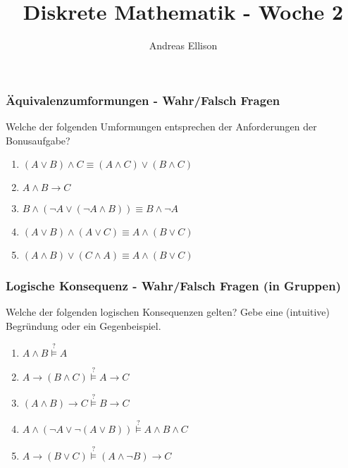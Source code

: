 \documentclass[t,dvipsnames]{beamer}
\title{Diskrete Mathematik - Woche 2}
\author{Andreas Ellison}
\begin{document}
\begin{frame}
	\frametitle{Äquivalenzumformungen - Wahr/Falsch Fragen}
	Welche der folgenden Umformungen entsprechen der Anforderungen der Bonusaufgabe?
	\begin{enumerate}
		\item<1-> $(A \lor B) \land C \equiv (A \land C) \lor (B \land C)$

		\item<3->
			$A \land B \rightarrow C$

		\item<5->
			$B \land (\neg A \lor (\neg A \land B)) \equiv B \land \neg A$

		\item<7->
			$(A \lor B) \land (A \lor C) \equiv A \land (B \lor C)$

		\item<9->
			$(A \land B) \lor (C \land A) \equiv A \land (B \lor C)$

	\end{enumerate}
\end{frame}


\begin{frame}
	\frametitle{Logische Konsequenz - Wahr/Falsch Fragen (in Gruppen)}
	Welche der folgenden logischen Konsequenzen gelten? Gebe eine (intuitive) Begründung oder ein Gegenbeispiel.
	\begin{enumerate}
		\item<1-> $A \land B  \stackrel{?}{\models} A$

		\item<3-> $A \rightarrow (B \land C) \stackrel{?}{\models} A \rightarrow C$

		\item<5-> $(A \land B) \rightarrow C \stackrel{?}{\models} B \rightarrow C$

		\item<7-> $A \land (\neg A \lor \neg(A \lor B)) \stackrel{?}{\models} A \land B \land C$


		\item<9-> $A \rightarrow (B \lor C) \stackrel{?}{\models} (A \land \neg B) \rightarrow C$

	\end{enumerate}
\end{frame}
\end{document}
